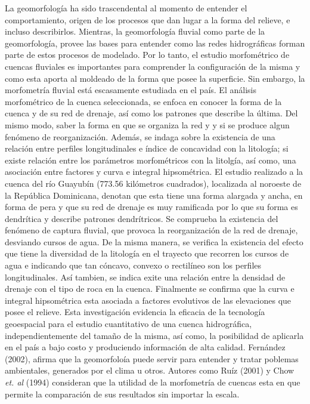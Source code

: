 \documentclass[11pt,]{article}
\renewenvironment{abstract}
 {{%
    \setlength{\leftmargin}{0mm}
    \setlength{\rightmargin}{\leftmargin}%
  }%
  \relax}
 {\endlist}
\begin{document}
\begin{abstract}

    \hbox{\vrule height .2pt width 39.14pc}

    \vskip 8.5pt %

\noindent La geomorfología ha sido trascendental al momento de entender el
comportamiento, origen de los procesos que dan lugar a la forma del
relieve, e incluso describirlos. Mientras, la geomorfología fluvial como
parte de la geomorfología, provee las bases para entender como las redes
hidrográficas forman parte de estos procesos de modelado. Por lo tanto,
el estudio morfométrico de cuencas fluviales es importantes para
comprender la configuración de la misma y como esta aporta al moldeado
de la forma que posee la superficie. Sin embargo, la morfometría fluvial
está escasamente estudiada en el país. El análisis morfométrico de la
cuenca seleccionada, se enfoca en conocer la forma de la cuenca y de su
red de drenaje, así como los patrones que describe la última. Del mismo
modo, saber la forma en que se organiza la red y y si se produce algun
fenómeno de reorganización. Además, se indaga sobre la existencia de una
relación entre perfiles longitudinales e índice de concavidad con la
litología; si existe relación entre los parámetros morfométricos con la
litolgía, así como, una asociación entre factores y curva e integral
hipsométrica. El estudio realizado a la cuenca del río Guayubín (773.56
kilómetros cuadrados), localizada al noroeste de la República
Dominicana, denotan que esta tiene una forma alargada y ancha, en forma
de pera y que su red de drenaje es muy ramificada por lo que su forma es
dendrítica y describe patrones dendrítricos. Se comprueba la existencia
del fenómeno de captura fluvial, que provoca la reorganización de la red
de drenaje, desviando cursos de agua. De la misma manera, se verifica la
existencia del efecto que tiene la diversidad de la litología en el
trayecto que recorren los cursos de agua e indicando que tan cóncavo,
convexo o rectilíneo son los perfiles longitudinales. Así tambien, se
indica exite una relación entre la densidad de drenaje con el tipo de
roca en la cuenca. Finalmente se confirma que la curva e integral
hipsométrica esta asociada a factores evolutivos de las elevaciones que
posee el relieve. Esta investigación evidencia la eficacia de la
tecnología geoespacial para el estudio cuantitativo de una cuenca
hidrográfica, independientemente del tamaño de la misma, así como, la
posibilidad de aplicarla en el país a bajo costo y produciendo
información de alta calidad. Fernández (2002), afirma que la
geomorfoloía puede servir para entender y tratar poblemas ambientales,
generados por el clima u otros. Autores como Ruíz (2001) y Chow
\emph{et. al} (1994) consideran que la utilidad de la morfometría de
cuencas esta en que permite la comparación de sus resultados sin
importar la escala.



\end{abstract}
\end{document}
